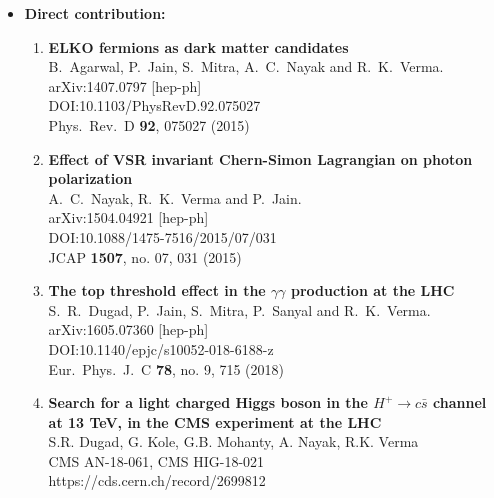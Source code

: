 \begin{itemize}[leftmargin=*]
\item {\textbf{Direct contribution:}
\begin{enumerate}[leftmargin=*]
\item%
{\bf {ELKO fermions as dark matter candidates}}
  \\{}B.~Agarwal, P.~Jain, S.~Mitra, A.~C.~Nayak and R.~K.~Verma.
  \\{}arXiv:1407.0797 [hep-ph]
  \\{}DOI:10.1103/PhysRevD.92.075027
  \\{}Phys.\ Rev.\ D {\bf 92}, 075027 (2015)

\item%
{\bf {Effect of VSR invariant Chern-Simon Lagrangian on photon polarization}}
  \\{}A.~C.~Nayak, R.~K.~Verma and P.~Jain.
  \\{}arXiv:1504.04921 [hep-ph]
  \\{}DOI:10.1088/1475-7516/2015/07/031
  \\{}JCAP {\bf 1507}, no. 07, 031 (2015)

\item%
{\bf {The top threshold effect in the $\gamma\gamma$ production at the LHC}}
  \\{}S.~R.~Dugad, P.~Jain, S.~Mitra, P.~Sanyal and R.~K.~Verma.
  \\{}arXiv:1605.07360 [hep-ph]
  \\{}DOI:10.1140/epjc/s10052-018-6188-z
  \\{}Eur.\ Phys.\ J.\ C {\bf 78}, no. 9, 715 (2018)

\item
{\bf {Search for a light charged Higgs boson in the $H^{+}\to c\bar{s}$ channel 
at 13 TeV, in the CMS experiment at the LHC}}
  \\{}S.R. Dugad, G. Kole, G.B. Mohanty, A. Nayak, R.K. Verma
  \\{} CMS AN-18-061, CMS HIG-18-021
  \\{} https://cds.cern.ch/record/2699812


\end{enumerate}}
\end{itemize}
